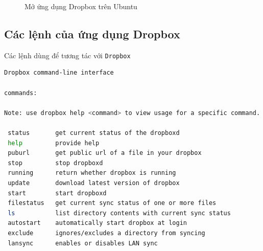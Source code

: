 \begin{list}{--}{}
\begin{figure}[!h]
\begin{center}
	 \hspace{.5cm}
\end{center}
\caption{Mở ứng dụng \textsf{Dropbox} trên \textsf{Ubuntu}}
\end{figure}
\end{list}
\subsection{Các lệnh của ứng dụng Dropbox}
\begin{list}{--}{}
\item[]Các lệnh dùng để tương tác với \verb|Dropbox|
\begin{lstlisting}[language=bash]
Dropbox command-line interface

commands:

Note: use dropbox help <command> to view usage for a specific command.

 status       get current status of the dropboxd
 help         provide help
 puburl       get public url of a file in your dropbox
 stop         stop dropboxd
 running      return whether dropbox is running
 update       download latest version of dropbox
 start        start dropboxd
 filestatus   get current sync status of one or more files
 ls           list directory contents with current sync status
 autostart    automatically start dropbox at login
 exclude      ignores/excludes a directory from syncing
 lansync      enables or disables LAN sync
\end{lstlisting}
\end{list}